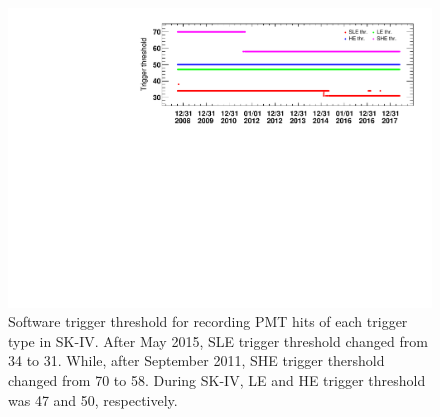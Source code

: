 
\begin{figure}[h]
	\centering
	\includegraphics[width=15cm]{Figures/SK/softtrg_thr_time_vari_SK4}
	\caption[Software trigger threshold for recording PMT hits of each trigger type in SK-IV]{
	Software trigger threshold for recording PMT hits of each trigger type in SK-IV.
	After May 2015, SLE trigger threshold changed from 34 to 31.
	While, after September 2011, SHE trigger thershold changed from 70 to 58.
	During SK-IV, LE and HE trigger threshold was 47 and 50, respectively.
	}\label{SK_softtrg_SK4}
\end{figure}

